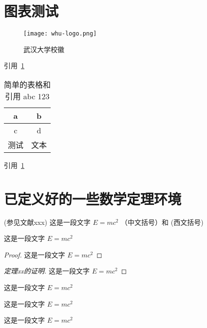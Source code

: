 \documentclass[type = doctor]{whu-thesis}
\begin{document}
\section{图表测试}

\begin{figure}[ht]
  \centering
  \texttt{[image: whu-logo.png]}
  \caption{武汉大学校徽}
  \label{fig:武汉大学校徽}
\end{figure}

引用~\ref{fig:武汉大学校徽}

\begin{table}[ht]
  \centering
  \caption{%
    简单的表格和引用 abc 123 %
  }
  \label{table:简单的表格}
  \begin{tabular}{cc}
    \hline
    a & b \\\hline
    c & d \\\hline
    测试 & 文本 \\\hline
  \end{tabular}
\end{table}

引用~\ref{table:简单的表格}


\section{已定义好的一些数学定理环境}


\begin{definition}[测度]
  (参见文献xxx) 这是一段文字 $E = m c^2$  （中文括号）和 (西文括号)
\end{definition}

\begin{theorem}
  这是一段文字 $E = m c^2$
\end{theorem}


\begin{proof}
  这是一段文字 $E = m c^2$
\end{proof}

\begin{proof}[定理xx的证明]
  这是一段文字 $E = m c^2$
\end{proof}

\begin{example}
  这是一段文字 $E = m c^2$
\end{example}

\begin{property}
  这是一段文字 $E = m c^2$
\end{property}

\begin{proposition}
  这是一段文字 $E = m c^2$
\end{proposition}
\end{document}
